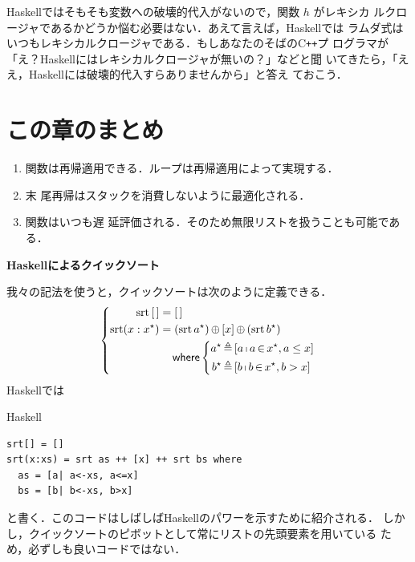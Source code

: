 \documentclass[a5paper,twoside,fleqn,draft]{jsbook}
\newcommand{\programminglanguage}[1]{\textsf{#1}}
\newcommand{\cxx}{\programminglanguage{C}\texttt{++}}
\newcommand{\haskell}{\programminglanguage{Haskell}}
\newenvironment{note}[1]{\begin{boxnote}\begin{center}\textbf{#1}\end{center}}{\end{boxnote}}
\newenvironment{haskellcode}{\begin{itembox}[r]{\haskell}}{\end{itembox}}
\newcommand{\mKeyword}[1]{\mathsf{#1}} %
\newcommand{\mWhereKeyword}{\mKeyword{where}}
\DeclareMathOperator{\mWhere}{\mWhereKeyword}
\newcommand{\mEmptyList}{{[\,]}}
\newcommand{\mSpecialFunc}[1]{\mathrm{#1}}
\DeclareMathOperator{\mSort}{\mSpecialFunc{srt}}
\DeclareMathOperator{\mAppend}{\oplus}
\DeclareMathOperator{\mFrom}{\in}
\DeclareMathOperator{\mLetEq}{\triangleq}
\newcommand{\mListWith}[1]{\left[#1\right]}
\newcommand{\mList}[1]{{#1}^\mathrm{\star}}
\DeclareMathOperator{\mListComp}{\shortmid}
\begin{document}
\haskell ではそもそも変数への破壊的代入がないので，関数 $h$ がレキシカ
ルクロージャであるかどうか悩む必要はない．あえて言えば，\haskell では
ラムダ式はいつもレキシカルクロージャである．もしあなたのそばの\cxx プ
ログラマが「え？\haskell にはレキシカルクロージャが無いの？」などと聞
いてきたら，「ええ，\haskell には破壊的代入すらありませんから」と答え
ておこう．

\section{この章のまとめ}

\begin{enumerate}
\item 関数は再帰適用できる．ループは再帰適用によって実現する．\item 末
  尾再帰はスタックを消費しないように最適化される．\item 関数はいつも遅
  延評価される．そのため無限リストを扱うことも可能である．
\end{enumerate}

\begin{note}{\haskell によるクイックソート}
我々の記法を使うと，クイックソートは次のように定義できる．
\begin{equation*}
  \left\{
  \begin{aligned}
    \mSort\mEmptyList
    &=\mEmptyList\\
    \mSort(x:\mList{x})
    &=(\mSort\mList{a})\mAppend\mListWith{x}\mAppend{}(\mSort\mList{b})\\
    &\quad\mWhere\left\{\begin{aligned}
    \mList{a}&\mLetEq\mListWith{a\mListComp a\mFrom\mList{x},a\le x}\\
    \mList{b}&\mLetEq\mListWith{b\mListComp b\mFrom\mList{x},b>x}
    \end{aligned}
    \right.
  \end{aligned}
  \right.
\end{equation*}
\haskell では %
\begin{haskellcode}
\begin{verbatim}
srt[] = []
srt(x:xs) = srt as ++ [x] ++ srt bs where
  as = [a| a<-xs, a<=x]
  bs = [b| b<-xs, b>x]
\end{verbatim}
\end{haskellcode}
と書く．このコードはしばしば\haskell のパワーを示すために紹介される．
しかし，クイックソートのピボットとして常にリストの先頭要素を用いている
ため，必ずしも良いコードではない．
\end{note}
\end{document}
